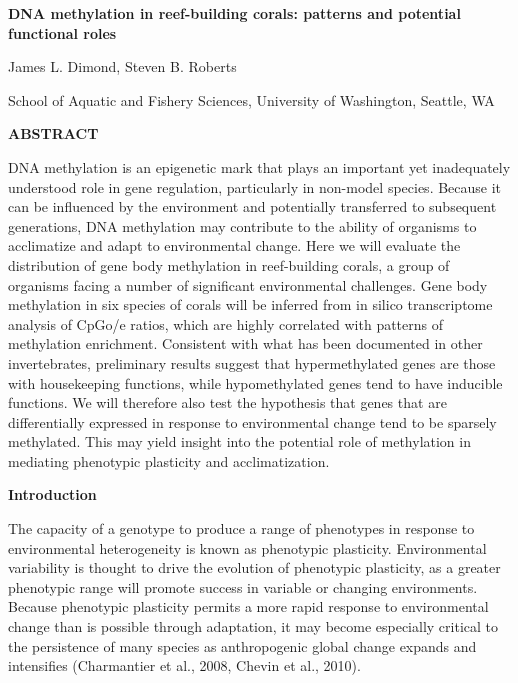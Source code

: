 \textbf{DNA methylation in reef-building corals: patterns and potential functional roles}

James L. Dimond, Steven B. Roberts

School of Aquatic and Fishery Sciences, University of Washington, Seattle, WA


\textbf{ABSTRACT}

DNA methylation is an epigenetic mark that plays an important yet inadequately understood role in gene regulation, particularly in non-model species. Because it can be influenced by the environment and potentially transferred to subsequent generations, DNA methylation may contribute to the ability of organisms to acclimatize and adapt to environmental change. Here we will evaluate the distribution of gene body methylation in reef-building corals, a group of organisms facing a number of significant environmental challenges. Gene body methylation in six species of corals will be inferred from in silico transcriptome analysis of CpGo/e ratios, which are highly correlated with patterns of methylation enrichment. Consistent with what has been documented in other invertebrates, preliminary results suggest that hypermethylated genes are those with housekeeping functions, while hypomethylated genes tend to have inducible functions. We will therefore also test the hypothesis that genes that are differentially expressed in response to environmental change tend to be sparsely methylated. This may yield insight into the potential role of methylation in mediating phenotypic plasticity and acclimatization. 

\textbf{Introduction}
 
The capacity of a genotype to produce a range of phenotypes in response to environmental heterogeneity is known as phenotypic plasticity. Environmental variability is thought to drive the evolution of phenotypic plasticity, as a greater phenotypic range will promote success in variable or changing environments. Because phenotypic plasticity permits a more rapid response to environmental change than is possible through adaptation, it may become especially critical to the persistence of many species as anthropogenic global change expands and intensifies (Charmantier et al., 2008, Chevin et al., 2010). 
 
